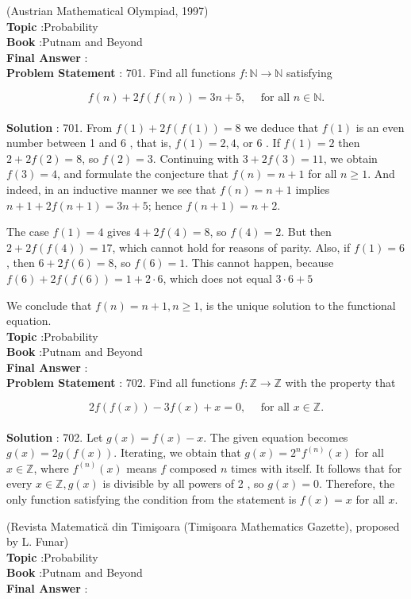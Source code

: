 \documentclass[10pt]{article}
\begin{document}
(Austrian Mathematical Olympiad, 1997)
\\
\textbf{Topic} :Probability\\
\textbf{Book} :Putnam and Beyond\\
\textbf{Final Answer} :\\


\textbf{Problem Statement} :
701. Find all functions $f: \mathbb{N} \rightarrow \mathbb{N}$ satisfying

$$
f(n)+2 f(f(n))=3 n+5, \quad \text { for all } n \in \mathbb{N} .
$$
\\
\textbf{Solution} :
701. From $f(1)+2 f(f(1))=8$ we deduce that $f(1)$ is an even number between 1 and 6 , that is, $f(1)=2,4$, or 6 . If $f(1)=2$ then $2+2 f(2)=8$, so $f(2)=3$. Continuing with $3+2 f(3)=11$, we obtain $f(3)=4$, and formulate the conjecture that $f(n)=n+1$ for all $n \geq 1$. And indeed, in an inductive manner we see that $f(n)=n+1$ implies $n+1+2 f(n+1)=3 n+5$; hence $f(n+1)=n+2$.

The case $f(1)=4$ gives $4+2 f(4)=8$, so $f(4)=2$. But then $2+2 f(f(4))=17$, which cannot hold for reasons of parity. Also, if $f(1)=6$, then $6+2 f(6)=8$, so $f(6)=1$. This cannot happen, because $f(6)+2 f(f(6))=1+2 \cdot 6$, which does not equal $3 \cdot 6+5$

We conclude that $f(n)=n+1, n \geq 1$, is the unique solution to the functional equation.
\\
\textbf{Topic} :Probability\\
\textbf{Book} :Putnam and Beyond\\
\textbf{Final Answer} :\\


\textbf{Problem Statement} :
702. Find all functions $f: \mathbb{Z} \rightarrow \mathbb{Z}$ with the property that

$$
2 f(f(x))-3 f(x)+x=0, \quad \text { for all } x \in \mathbb{Z} .
$$
\\
\textbf{Solution} :
702. Let $g(x)=f(x)-x$. The given equation becomes $g(x)=2 g(f(x))$. Iterating, we obtain that $g(x)=2^{n} f^{(n)}(x)$ for all $x \in \mathbb{Z}$, where $f^{(n)}(x)$ means $f$ composed $n$ times with itself. It follows that for every $x \in \mathbb{Z}, g(x)$ is divisible by all powers of 2 , so $g(x)=0$. Therefore, the only function satisfying the condition from the statement is $f(x)=x$ for all $x$.

(Revista Matematică din Timişoara (Timişoara Mathematics Gazette), proposed by L. Funar)
\\
\textbf{Topic} :Probability\\
\textbf{Book} :Putnam and Beyond\\
\textbf{Final Answer} :\\
\end{document}
